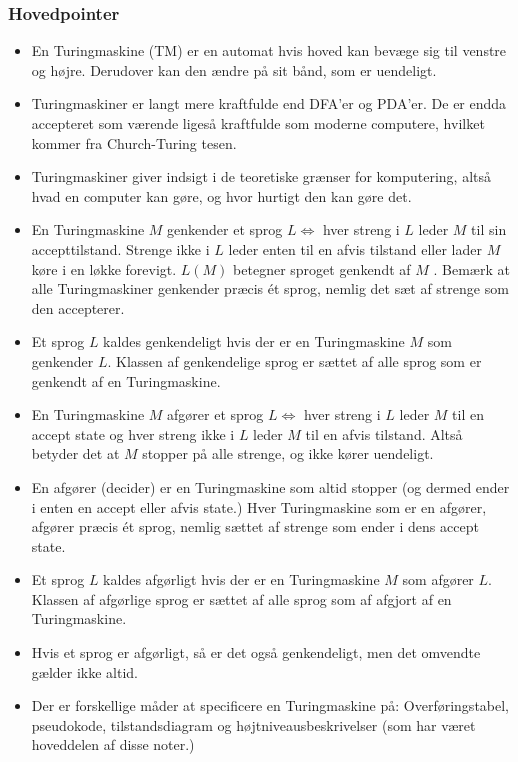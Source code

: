 \begin{frame}[allowframebreaks]
  \frametitle{Hovedpointer}
\begin{itemize}
  \item En Turingmaskine (TM) er en automat hvis hoved kan bevæge sig til venstre
og højre. Derudover kan den ændre på sit bånd, som er uendeligt.
\item Turingmaskiner er langt mere kraftfulde end DFA’er og PDA’er. De er endda
accepteret som værende ligeså kraftfulde som moderne computere, hvilket
kommer fra Church-Turing tesen.
\item Turingmaskiner giver indsigt i de teoretiske grænser for komputering, altså
hvad en computer kan gøre, og hvor hurtigt den kan gøre det.
\item En Turingmaskine $M$ genkender et sprog $L \iff$ hver streng i $L$ leder $M$
til sin accepttilstand. Strenge ikke i $L$ leder enten til en afvis tilstand eller lader
$M$ køre i en løkke forevigt. $L(M )$ betegner sproget genkendt af $M$ . Bemærk
at alle Turingmaskiner genkender præcis ét sprog, nemlig det sæt af strenge
som den accepterer.
\item Et sprog $L$ kaldes genkendeligt hvis der er en Turingmaskine $M$ som
genkender $L$. Klassen af genkendelige sprog er sættet af alle sprog som er
genkendt af en Turingmaskine.
\item En Turingmaskine $M$ afgører et sprog $L \iff$ hver streng i $L$ leder $M$ til en
accept state og hver streng ikke i $L$ leder $M$ til en afvis tilstand. Altså betyder
det at $M$ stopper på alle strenge, og ikke kører uendeligt.
\item En afgører (decider) er en Turingmaskine som altid stopper (og dermed
ender i enten en accept eller afvis state.) Hver Turingmaskine som er en
afgører, afgører præcis ét sprog, nemlig sættet af strenge som ender i dens
accept state.
\item Et sprog $L$ kaldes afgørligt hvis der er en Turingmaskine $M$ som afgører
$L$. Klassen af afgørlige sprog er sættet af alle sprog som af afgjort af en
Turingmaskine.
\item Hvis et sprog er afgørligt, så er det også genkendeligt, men det omvendte
gælder ikke altid.
\item Der er forskellige måder at specificere en Turingmaskine på: Overføringstabel,
pseudokode, tilstandsdiagram og højtniveausbeskrivelser (som har været
hoveddelen af disse noter.)
\end{itemize}
\end{frame}



